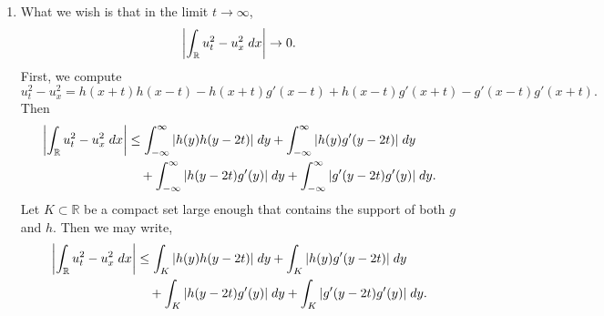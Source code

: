 \documentclass{article}
\begin{document}
\begin{enumerate}[itemsep =-2pt,label = (\alph{*})]
\begin{enumerate}[itemsep =-2pt,label = (\roman{*})]
		\begin{align*}
			\begin{split}
				\dot{e}(t) &= \frac{1}{2}\frac{\partial}{\partial t}\int_{-\infty}^{\infty}u_t^2 + u_x^2\;dx = \frac{1}{2}\frac{\partial}{\partial t}\int_{K_T}u_t^2 + u_x^2\;dx \\
				&= \frac{1}{2}\int_{K_T}\partial_t(u_t^2 + u_x^2)\;dx \\
				&= \int_{K_T}u_tu_{tt} + u_x \cdot \partial_x u_t\;dx \\
				&= \int_{K_T}u_t(u_{tt} - u_{xx})\;dx \qquad (\text{by integration by parts}) \\
				&= 0, 
			\end{split}
		\end{align*}	
		where there is no boundary term since $u_x, u_t$ are supported inside $K_T$. So we have shown that $\dot{e}(t) = 0$ for all $0 \leq t \leq T$. Since $T > 0$ was chosen arbitrarily, it follows that $\dot{e}(t)\equiv 0$. Therefore, the total energy is constant in $t$. 
		\item What we wish is that in the limit $t \to \infty$, 
		\begin{equation*}
			\left| \int_{\mathbb{R}}u_t^2 - u_x^2\;dx \right| \to 0. 
		\end{equation*}
		First, we compute 
		\begin{equation*}
			u_t^2 - u_x^2 = h(x + t)h(x - t) - h(x + t)g'(x - t) + h(x - t)g'(x + t) - g'(x - t)g'(x + t). 
		\end{equation*}
		Then 
		\begin{align*}
			\begin{split}
				\left| \int_{\mathbb{R}}u_t^2 - u_x^2\;dx \right| &\leq \int_{-\infty}^{\infty}|h(y)h(y - 2t)|\;dy + \int_{-\infty}^{\infty}|h(y)g'(y - 2t)|\;dy \\
				&\quad+ \int_{-\infty}^{\infty}|h(y - 2t)g'(y)|\;dy + \int_{-\infty}^{\infty}|g'(y - 2t)g'(y)|\;dy.
			\end{split}
		\end{align*}
		Let $K \subset \mathbb{R}$ be a compact set large enough that contains the support of both $g$ and $h$. Then we may write, 
		\begin{align*}
			\begin{split}
				\left| \int_{\mathbb{R}}u_t^2 - u_x^2\;dx \right| &\leq \int_{K}|h(y)h(y - 2t)|\;dy + \int_{K}|h(y)g'(y - 2t)|\;dy \\
				&\quad+ \int_{K}|h(y - 2t)g'(y)|\;dy + \int_{K}|g'(y - 2t)g'(y)|\;dy.
			\end{split}
		\end{align*}

\end{enumerate}
\end{enumerate}
\end{document}
